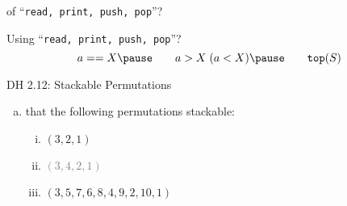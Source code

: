 \begin{frame}{}
  \begin{definition}
  \end{definition}

  \vspace{0.40cm}
  \pause
    of ``\texttt{read, print, push, pop}''?

  \vspace{0.20cm}
  \pause
   Using  ``\texttt{read, print, push, pop}''?
    \[
      a == X  \pause \qquad a > X \; (a < X) \pause \qquad \texttt{top}(S)
    \]
\end{frame}
\begin{frame}{}
  \begin{exampleblock}{DH 2.12: Stackable Permutations}
    \begin{enumerate}[(a)]
      \item {} that the following permutations \emph{} stackable:
	\begin{enumerate}[(i)]
	  \item $(3, 2, 1)$
	  \item \textcolor{gray}{$(3, 4, 2, 1)$}
	  \item $(3, 5, 7, 6, 8, 4, 9, 2, 10, 1)$
	\end{enumerate}
    \end{enumerate}
  \end{exampleblock}

  \vspace{0.50cm}
\end{frame}

